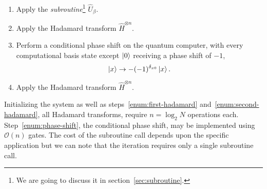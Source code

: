 \begin{enumerate}
  \item Apply the \emph{subroutine}\footnote{We are going to discuss it in section~\ref{sec:subroutine}.} $\hat{U}_\beta$.
  \item Apply the Hadamard transform $\hat{H}^{\otimes n}$. \label{enum:first-hadamard}
  \item \label{enum:phase-shift} Perform a conditional phase shift on the quantum computer, with every computational basis state except $\ket{0}$ receiving a phase shift of $-1$,
  \begin{equation*}
      \ket{x} \rightarrow -(-1)^{\delta_{x0}} \ket{x}.
  \end{equation*}
  \item Apply the Hadamard transform $\hat{H}^{\otimes n}$. \label{enum:second-hadamard}
\end{enumerate}
Initializing the system as well as steps~\ref{enum:first-hadamard} and~\ref{enum:second-hadamard}, all Hadamard transforms, require $n=\log_2{N}$ operations each. Step~\ref{enum:phase-shift}, the conditional phase shift, may be implemented using $\mathcal{O}(n)$ gates. The cost of the subroutine call depends upon the specific application but we can note that the iteration requires only a single subroutine call.


